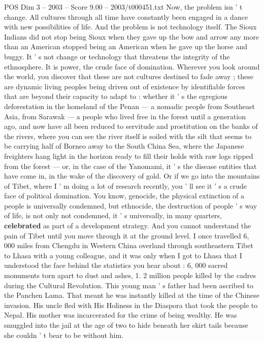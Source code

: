\begin{textsample}{POS Dim 3 – 2003 – Score 9.00 – 2003/t000451.txt}
Now, the problem isn ' t change.
All cultures through all time have constantly been engaged in a dance with new possibilities of life.
And the problem is not technology itself.
The Sioux Indians did not stop being Sioux when they gave up the bow and arrow any more than an American stopped being an American when he gave up the horse and buggy.
It ' s not change or technology that threatens the integrity of the ethnosphere.
It is power, the crude face of domination.
Wherever you look around the world, you discover that these are not cultures destined to fade away ; these are dynamic living peoples being driven out of existence by identifiable forces that are beyond their capacity to adapt to : whether it ' s the egregious deforestation in the homeland of the Penan — a nomadic people from Southeast Asia, from Sarawak — a people who lived free in the forest until a generation ago, and now have all been reduced to servitude and prostitution on the banks of the rivers, where you can see the river itself is soiled with the silt that seems to be carrying half of Borneo away to the South China Sea, where the Japanese freighters hang light in the horizon ready to fill their holds with raw logs ripped from the forest — or, in the case of the Yanomami, it ' s the disease entities that have come in, in the wake of the discovery of gold.
Or if we go into the mountains of Tibet, where I ' m doing a lot of research recently, you ' ll see it ' s a crude face of political domination.
You know, genocide, the physical extinction of a people is universally condemned, but ethnocide, the destruction of people ' s way of life, is not only not condemned, it ' s universally, in many quarters, \textbf{celebrated} as part of a development strategy.
And you cannot understand the pain of Tibet until you move through it at the ground level.
I once travelled 6, 000 miles from Chengdu in Western China overland through southeastern Tibet to Lhasa with a young colleague, and it was only when I got to Lhasa that I understood the face behind the statistics you hear about : 6, 000 sacred monuments torn apart to dust and ashes, 1. 2 million people killed by the cadres during the Cultural Revolution.
This young man ' s father had been ascribed to the Panchen Lama.
That meant he was instantly killed at the time of the Chinese invasion.
His uncle fled with His Holiness in the Diaspora that took the people to Nepal.
His mother was incarcerated for the crime of being wealthy.
He was smuggled into the jail at the age of two to hide beneath her skirt tails because she couldn ' t bear to be without him.

\end{textsample}
